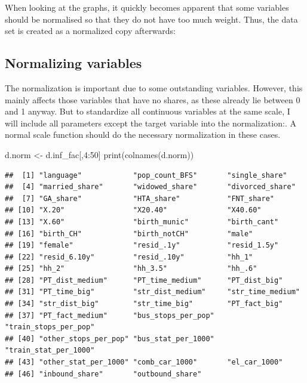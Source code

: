 \documentclass[
]{article}
\newenvironment{Shaded}{\begin{snugshade}}{\end{snugshade}}
\newcommand{\DecValTok}[1]{\textcolor[rgb]{0.00,0.00,0.81}{#1}}
\newcommand{\FunctionTok}[1]{\textcolor[rgb]{0.00,0.00,0.00}{#1}}
\newcommand{\NormalTok}[1]{#1}
\newcommand{\OtherTok}[1]{\textcolor[rgb]{0.56,0.35,0.01}{#1}}
\newcommand{\SpecialCharTok}[1]{\textcolor[rgb]{0.00,0.00,0.00}{#1}}
\begin{document}
When looking at the graphs, it quickly becomes apparent that some
variables should be normalised so that they do not have too much weight.
Thus, the data set is created as a normalized copy afterwards:

\hypertarget{normalizing-variables}{%
\subsection{Normalizing variables}\label{normalizing-variables}}

The normalization is important due to some outstanding variables.
However, this mainly affects those variables that have no shares, as
these already lie between 0 and 1 anyway. But to standardize all
continuous variables at the same scale, I will include all parameters
except the target variable into the normalization:. A normal scale
function should do the necessary normalization in these cases.

\begin{Shaded}
\begin{Highlighting}[]
\NormalTok{d.norm }\OtherTok{\textless{}{-}}\NormalTok{ d.inf\_fac[,}\DecValTok{4}\SpecialCharTok{:}\DecValTok{50}\NormalTok{]}
\FunctionTok{print}\NormalTok{(}\FunctionTok{colnames}\NormalTok{(d.norm))}
\end{Highlighting}
\end{Shaded}

\begin{verbatim}
##  [1] "language"            "pop_count_BFS"       "single_share"       
##  [4] "married_share"       "widowed_share"       "divorced_share"     
##  [7] "GA_share"            "HTA_share"           "FNT_share"          
## [10] "X.20"                "X20.40"              "X40.60"             
## [13] "X.60"                "birth_munic"         "birth_cant"         
## [16] "birth_CH"            "birth_notCH"         "male"               
## [19] "female"              "resid_.1y"           "resid_1.5y"         
## [22] "resid_6.10y"         "resid_.10y"          "hh_1"               
## [25] "hh_2"                "hh_3.5"              "hh_.6"              
## [28] "PT_dist_medium"      "PT_time_medium"      "PT_dist_big"        
## [31] "PT_time_big"         "str_dist_medium"     "str_time_medium"    
## [34] "str_dist_big"        "str_time_big"        "PT_fact_big"        
## [37] "PT_fact_medium"      "bus_stops_per_pop"   "train_stops_per_pop"
## [40] "other_stops_per_pop" "bus_stat_per_1000"   "train_stat_per_1000"
## [43] "other_stat_per_1000" "comb_car_1000"       "el_car_1000"        
## [46] "inbound_share"       "outbound_share"
\end{verbatim}
\end{document}
